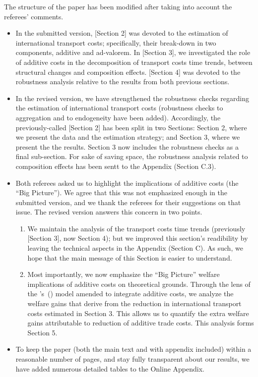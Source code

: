 \documentclass[a4paper,11pt]{article}
\newcommand\cites[1]{\citeauthor{#1}'s\ (\citeyear{#1})}
\begin{document}
The structure of the paper has been modified after taking into account the referees' comments.
\begin{itemize}
	\item In the submitted version, [Section 2] was devoted to the estimation of international transport costs; specifically, their break-down in two components, additive and ad-valorem. In [Section 3], we investigated the role of additive costs in the decomposition of transport costs time trends, between structural changes and composition effects. [Section 4] was devoted to the robustness analysis relative to the results from both previous sections.
	\item In the revised version, we have strengthened the robustness checks regarding the estimation of international transport costs (robustness checks to aggregation and to endogeneity have been added). Accordingly, the previously-called [Section 2] has been split in two Sections: Section 2, where we present the data and the estimation strategy; and Section 3, where we present the the results. Section 3 now includes the robustness checks as a final sub-section. For sake of saving space, the robustness analysis related to composition effects has been sentt to the Appendix (Section C.3).
	\item Both referees asked us to highlight the implications of additive costs (the ``Big Picture''). We agree that this was not emphasized enough in the submitted version, and we thank the referees for their suggestions on that issue. The revised version answers this concern in two points.
	\begin{enumerate}
		\item We maintain the analysis of the transport costs time trends (previously [Section 3], now Section 4); but we improved this section’s readibility by leaving the technical aspects in the Appendix (Section C). As such, we hope that the main message of this Section is easier to understand.
		\item Most importantly, we now emphasize the ``Big Picture'' welfare implications of additive costs on theoretical grounds. Through the lens of the \cites{melitz} model amended to integrate additive costs, we analyze the welfare gains that derive from the reduction in international transport costs estimated in Section 3. This allows us to quantify the extra welfare gains attributable to reduction of additive trade costs. This analysis forms Section 5.
	\end{enumerate}
	\item To keep the paper (both the main text and with appendix included) within a reasonable number of pages, and stay fully transparent about our results, we have added numerous detailed tables to the Online Appendix.
\end{itemize}
\end{document}
